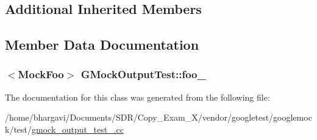 \subsection*{Additional Inherited Members}


\subsection{Member Data Documentation}
\subsubsection[{\texorpdfstring{foo\+\_\+}{foo_}}]{$<${\bf Mock\+Foo}$>$ G\+Mock\+Output\+Test\+::foo\+\_\+\hspace{0.3cm}{\ttfamily [protected]}}\hypertarget{class_g_mock_output_test_aed97d2ca515d69466968c60575cc18a2}{}\label{class_g_mock_output_test_aed97d2ca515d69466968c60575cc18a2}


The documentation for this class was generated from the following file\+:\begin{DoxyCompactItemize}
\item 
/home/bhargavi/\+Documents/\+S\+D\+R/\+Copy\+\_\+\+Exam\+\_\+X/vendor/googletest/googlemock/test/\hyperlink{gmock__output__test___8cc}{gmock\+\_\+output\+\_\+test\+\_\+.\+cc}\end{DoxyCompactItemize}
